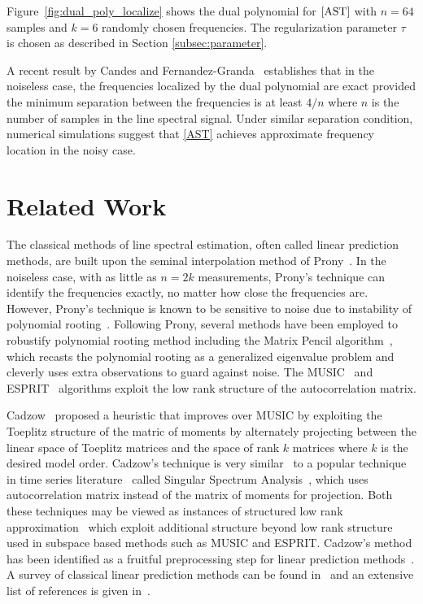 Figure~\ref{fig:dual_poly_localize} shows the dual
polynomial for $\eqref{AST}$ with $n = 64$ samples and $k = 6$
 randomly chosen frequencies. The regularization
parameter $\tau$ is chosen as described in Section \ref{subsec:parameter}.

A recent result by Candes and Fernandez-Granda~\cite{CandesGranda} establishes
that in the noiseless case, the frequencies localized by the dual polynomial
are exact provided the minimum separation between the frequencies is at least
$4/n$ where $n$ is the number of samples in the line spectral signal. Under similar separation condition, numerical simulations suggest that \eqref{AST} achieves approximate frequency location in the noisy case. 

\section{Related Work}
\label{sec:prony-method}



The classical methods of line spectral estimation, often called linear
prediction methods, are built upon the seminal interpolation method of
Prony~\cite{prony1795}. In the noiseless case, with as little as $n=2k$
measurements, Prony's technique can identify the frequencies exactly, no matter
how close the frequencies are. However, Prony's technique is known to be
sensitive to noise due to instability of polynomial rooting~\cite{kahn92}.
Following Prony, several methods have been employed to robustify polynomial
rooting method including the Matrix Pencil algorithm~\cite{hua02}, which
recasts the polynomial rooting as a generalized eigenvalue problem and cleverly
uses extra observations to guard against noise. The MUSIC~\cite{music} and
ESPRIT~\cite{esprit} algorithms exploit the low rank structure of the
autocorrelation matrix.


Cadzow~\cite{cadzow02} proposed a heuristic that improves over MUSIC by 
exploiting the Toeplitz structure of the matric of moments by alternately
projecting between the linear space of Toeplitz matrices and the space of rank
$k$ matrices where $k$ is the desired model order.
Cadzow's technique is very similar~\cite{ssa_special_issue} to a popular
technique in time series literature~\cite{tsbook1,tsbook2} called Singular
Spectrum Analysis~\cite{ssa}, which uses autocorrelation matrix instead
of the matrix of moments for projection. Both these techniques may be viewed as
instances of structured low rank approximation~\cite{chu2003structured} which
exploit additional structure beyond low rank structure used in subspace based
methods such as MUSIC and ESPRIT. Cadzow's method has been identified as a  fruitful preprocessing step for linear prediction methods~\cite{blu08}. A  survey of classical linear prediction methods can be found in~\cite{blu08,StoicaMoses} and an extensive list of references is given in~\cite{stoica93}.

